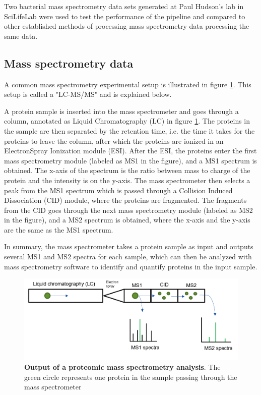 Two bacterial mass spectrometry data sets generated at Paul Hudson's lab in SciLifeLab were used to test the performance of the pipeline and compared to other established methods of processing mass spectrometry data processing the same data.

\subsection{Mass spectrometry data}

A common mass spectrometry experimental setup is illustrated in figure \ref{fig:mass-spec}. This setup is called a "LC-MS/MS" and is explained below.

A protein sample is inserted into the mass spectrometer and goes through a column, annotated as Liquid Chromatography (LC) in figure \ref{fig:mass-spec}. The proteins in the sample are then separated by the retention time, i.e. the time it takes for the proteins to leave the column, after which the proteins are ionized in an ElectronSpray Ionization module (ESI). After the ESI, the proteins enter the first mass spectrometry module (labeled as MS1 in the figure), and a MS1 spectrum is obtained. The x-axis of the spectrum is the ratio between mass to charge of the protein and the intensity is on the y-axis. The mass spectrometer then selects a peak from the MS1 spectrum which is passed through a Collision Induced Dissociation (CID) module, where the proteins are fragmented. The fragments from the CID goes through the next mass spectrometry module (labeled as MS2 in the figure), and a MS2 spectrum is obtained, where the x-axis and the y-axis are the same as the MS1 spectrum. \cite{quantitative_analysis}

In summary, the mass spectrometer takes a protein sample as input and outputs several MS1 and MS2 spectra for each sample, which can then be analyzed with mass spectrometry software to identify and quantify proteins in the input sample.

\begin{figure}[H]
  \includegraphics[width=\linewidth]{pictures/mass_spec.png}
  \caption{\textbf{Output of a proteomic mass spectrometry analysis}. The green circle represents one protein in the sample passing through the mass spectrometer}
  \label{fig:mass-spec}
\end{figure}

